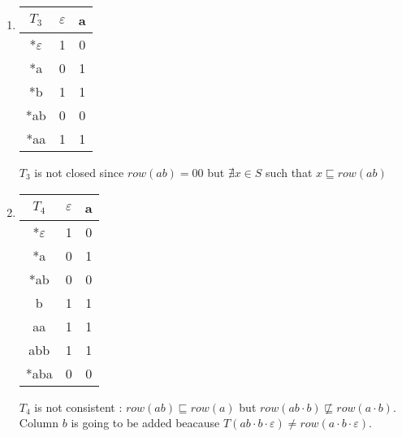 \begin{enumerate}
  \item \begin{minipage}{0.3\textwidth}
          \begin{tabular}{c||c |c}
            $T_3$          & $\varepsilon$ & a \\
            \hline\hline
            *$\varepsilon$ & 1             & 0 \\
            *a             & 0             & 1 \\
            \hline\hline
            *b             & 1             & 1 \\
            *ab            & 0             & 0 \\
            *aa            & 1             & 1 \\
          \end{tabular}
        \end{minipage}\quad
        \begin{minipage}{0.6\textwidth}
          $T_3$ is not closed since $row(ab) = 00$ but $\nexists x \in S$ such that $x \sqsubseteq row(ab)$
        \end{minipage}

  \item \begin{minipage}{0.3\textwidth}
          \begin{tabular}{c||c |c}
            $T_4$          & $\varepsilon$ & a \\
            \hline\hline
            *$\varepsilon$ & 1             & 0 \\
            *a             & 0             & 1 \\
            *ab            & 0             & 0 \\
            \hline\hline
            b              & 1             & 1 \\
            aa             & 1             & 1 \\
            abb            & 1             & 1 \\
            *aba           & 0             & 0 \\
          \end{tabular}
        \end{minipage}\quad
        \begin{minipage}{0.6\textwidth}
          $T_4$ is not consistent : $row(ab) \sqsubseteq row(a)$ but $row(ab \cdot b) \not\sqsubseteq row(a \cdot b)$. Column $b$ is going to be added beacause $T(ab \cdot b \cdot \varepsilon) \neq row(a \cdot b \cdot \varepsilon)$.
        \end{minipage}


\end{enumerate}
